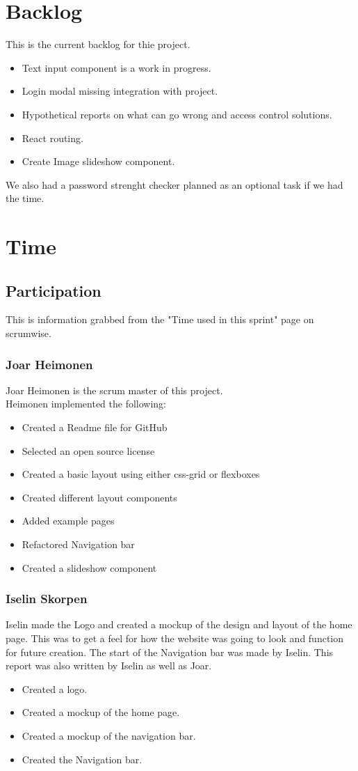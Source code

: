 \documentclass[12pt]{article}
\begin{document}
\section{Backlog}
This is the current backlog for thie project.
\begin{itemize}
    \item Text input component is a work in progress.
    \item Login modal missing integration with project.
    \item Hypothetical reports on what can go wrong and access control solutions.
    \item React routing.
    \item Create Image slideshow component.
\end{itemize}
We also had a password strenght checker planned as an optional task if we had the time.

\section{Time}
\subsection{Participation}
This is information grabbed from the "Time used in this sprint" page on scrumwise.
\subsubsection{Joar Heimonen}
Joar Heimonen is the scrum master of this project.\\
Heimonen implemented the following:
    \begin{itemize}
        \item Created a Readme file for GitHub
        \item Selected an open source license
        \item Created a basic layout using either css-grid or flexboxes
        \item Created different layout components
        \item Added example pages
        \item Refactored Navigation bar
        \item Created a slideshow component
    \end{itemize}
\subsubsection{Iselin Skorpen}
Iselin made the Logo and created a mockup of the design and layout of the home page. This was to get a feel for how the website was 
going to look and function for future creation. The start of the Navigation bar was made by Iselin. This report was also written by 
Iselin as well as Joar.
    \begin{itemize}
        \item Created a logo.
        \item Created a mockup of the home page.
        \item Created a mockup of the navigation bar.
        \item Created the Navigation bar.
    \end{itemize}
\end{document}
